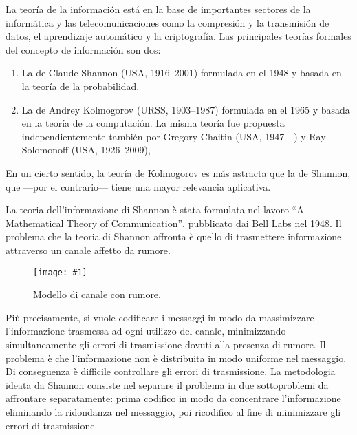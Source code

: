 \documentclass[11pt]{article}
\newcommand{\figscale}[2]{\texttt{[image: \#1]}}
\begin{document}
\begin{center}
\end{center}

\bigskip

La teoría de la información está en la base de importantes sectores de la informática y las telecomunicaciones como la compresión y la transmisión de datos, el aprendizaje automático y la criptografía. Las principales teorías formales del concepto de información son dos:
\begin{enumerate}
\item La de Claude Shannon (USA, 1916--2001) formulada en el 1948 y basada en la teoría de la probabilidad.
\item La de Andrey Kolmogorov (URSS, 1903--1987) formulada en el 1965 y basada en la teoría de la computación. La misma teoría fue propuesta independientemente también por Gregory Chaitin (USA, 1947--\ ) y Ray Solomonoff (USA, 1926--2009), 
\end{enumerate}
En un cierto sentido, la teoría de Kolmogorov es más astracta que la de Shannon, que ---por el contrario--- tiene una mayor relevancia aplicativa.

La teoria dell'informazione di Shannon è stata formulata nel lavoro ``A Mathematical Theory of Communication'', pubblicato dai Bell Labs nel 1948. Il problema che la teoria di Shannon affronta è quello di trasmettere informazione attraverso un canale affetto da rumore.

\begin{figure}[h]
\begin{center}
\figscale{Images/canale}{0.5}
\end{center}
\caption{
\label{fig:canale}
Modello di canale con rumore.
}
\end{figure}

Più precisamente, si vuole codificare i messaggi in modo da massimizzare l'informazione trasmessa ad ogni utilizzo del canale, minimizzando simultaneamente gli errori di trasmissione dovuti alla presenza di rumore. Il problema è che l'informazione non è distribuita in modo uniforme nel messaggio. Di conseguenza è difficile controllare gli errori di trasmissione. La metodologia ideata da Shannon consiste nel separare il problema in due sottoproblemi da affrontare separatamente: prima codifico in modo da concentrare l'informazione eliminando la ridondanza nel messaggio, poi ricodifico al fine di minimizzare gli errori di trasmissione.
\end{document}
